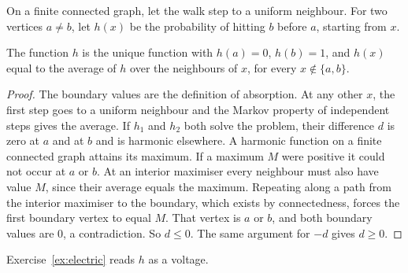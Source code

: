 On a finite connected graph, let the walk step to a uniform neighbour. For two vertices $a\ne b$, let $h(x)$ be the probability of hitting $b$ before $a$, starting from $x$.

\begin{proposition}\label{prop:harmonic}
The function $h$ is the unique function with $h(a)=0$, $h(b)=1$, and $h(x)$ equal to the average of $h$ over the neighbours of $x$, for every $x\notin\{a,b\}$.
\end{proposition}
\begin{proof}
The boundary values are the definition of absorption. At any other $x$, the first step goes to a uniform neighbour and the Markov property of independent steps gives the average. If $h_1$ and $h_2$ both solve the problem, their difference $d$ is zero at $a$ and at $b$ and is harmonic elsewhere. A harmonic function on a finite connected graph attains its maximum. If a maximum $M$ were positive it could not occur at $a$ or $b$. At an interior maximiser every neighbour must also have value $M$, since their average equals the maximum. Repeating along a path from the interior maximiser to the boundary, which exists by connectedness, forces the first boundary vertex to equal $M$. That vertex is $a$ or $b$, and both boundary values are $0$, a contradiction. So $d\le0$. The same argument for $-d$ gives $d\ge0$.
\end{proof}

Exercise~\ref{ex:electric} reads $h$ as a voltage.

